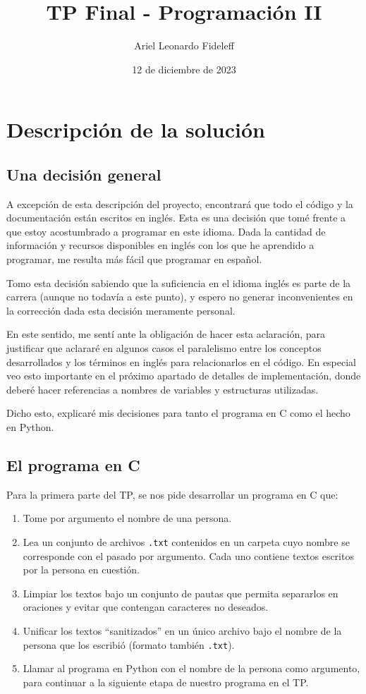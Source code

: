 \documentclass[a4paper]{article}
\title{TP Final - Programación II}
\author{Ariel Leonardo Fideleff}
\date{12 de diciembre de 2023}
\begin{document}
\maketitle

\section{Descripción de la solución}

\subsection{Una decisión general}

A excepción de esta descripción del proyecto, encontrará que todo el código y la documentación están escritos en inglés. Esta es una decisión que tomé frente a que estoy acostumbrado a programar en este idioma. Dada la cantidad de información y recursos disponibles en inglés con los que he aprendido a programar, me resulta más fácil que programar en español.

Tomo esta decisión sabiendo que la suficiencia en el idioma inglés es parte de la carrera (aunque no todavía a este punto), y espero no generar inconvenientes en la corrección dada esta decisión meramente personal.

En este sentido, me sentí ante la obligación de hacer esta aclaración, para justificar que aclararé en algunos casos el paralelismo entre los conceptos desarrollados y los términos en inglés para relacionarlos en el código. En especial veo esto importante en el próximo apartado de detalles de implementación, donde deberé hacer referencias a nombres de variables y estructuras utilizadas.

Dicho esto, explicaré mis decisiones para tanto el programa en C como el hecho en Python.

\subsection{El programa en C}

\noindent Para la primera parte del TP, se nos pide desarrollar un programa en C que:

\begin{enumerate}
    \item Tome por argumento el nombre de una persona.
    \item Lea un conjunto de archivos \texttt{.txt} contenidos en un carpeta cuyo nombre se corresponde con el pasado por argumento. Cada uno contiene textos escritos por la persona en cuestión.
    \item Limpiar los textos bajo un conjunto de pautas que permita separarlos en oraciones y evitar que contengan caracteres no deseados.
    \item Unificar los textos ``sanitizados'' en un único archivo bajo el nombre de la persona que los escribió (formato también \texttt{.txt}).
    \item Llamar al programa en Python con el nombre de la persona como argumento, para continuar a la siguiente etapa de nuestro programa en el TP.
\end{enumerate}
\end{document}
